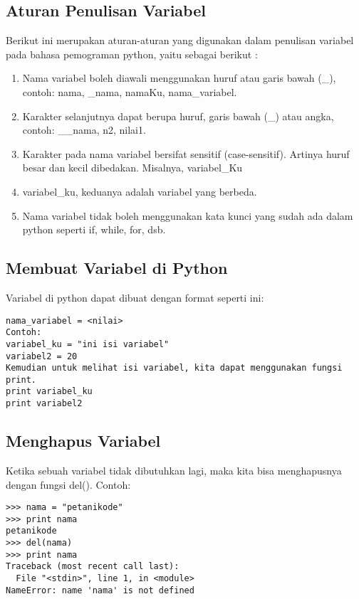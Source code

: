 \subsection{Aturan Penulisan Variabel}
Berikut ini merupakan aturan-aturan yang digunakan dalam penulisan variabel pada bahasa pemograman python, yaitu sebagai berikut :
\begin{enumerate}
	\item Nama variabel boleh diawali menggunakan huruf atau garis bawah (_), contoh: nama, _nama, namaKu, nama_variabel.
	\item Karakter selanjutnya dapat berupa huruf, garis bawah (_) atau angka, contoh: __nama, n2, nilai1.
	\item Karakter pada nama variabel bersifat sensitif (case-sensitif). Artinya huruf besar dan kecil dibedakan. Misalnya, variabel_Ku
	\item variabel_ku, keduanya adalah variabel yang berbeda.
	\item Nama variabel tidak boleh menggunakan kata kunci yang sudah ada dalam python seperti if, while, for, dsb.
\end{enumerate}  

\subsection{Membuat Variabel di Python}
Variabel di python dapat dibuat dengan format seperti ini:
\begin{verbatim}
nama_variabel = <nilai>
Contoh:
variabel_ku = "ini isi variabel"
variabel2 = 20
Kemudian untuk melihat isi variabel, kita dapat menggunakan fungsi print.
print variabel_ku
print variabel2
\end{verbatim}

\subsection{Menghapus Variabel}
Ketika sebuah variabel tidak dibutuhkan lagi, maka kita bisa menghapusnya dengan fungsi del().
Contoh:
\begin{verbatim}
>>> nama = "petanikode"
>>> print nama
petanikode
>>> del(nama)
>>> print nama
Traceback (most recent call last):
  File "<stdin>", line 1, in <module>
NameError: name 'nama' is not defined
\end{verbatim}
